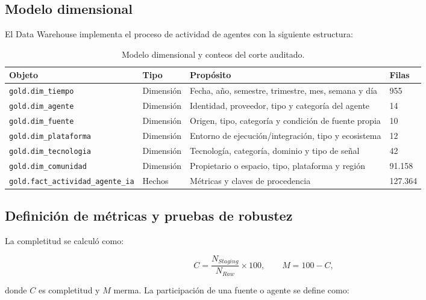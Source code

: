 \documentclass[12pt,a4paper]{article}
\newcommand{\pathcode}[1]{\begingroup\small\ttfamily\nolinkurl{#1}\endgroup}
\begin{document}
\subsection{Modelo dimensional}

El Data Warehouse implementa el proceso de actividad de agentes con la siguiente estructura:

\begin{table}[H]
\centering
\small
{}
\begin{tabularx}{\textwidth}{P{4.2cm} P{2.2cm} Y P{1.5cm}}
\toprule
{}
\textbf{Objeto} & \textbf{Tipo} & \textbf{Propósito} & \textbf{Filas} \\
\midrule
\pathcode{gold.dim_tiempo} & Dimensión & Fecha, año, semestre, trimestre, mes, semana y día & 955 \\
\pathcode{gold.dim_agente} & Dimensión & Identidad, proveedor, tipo y categoría del agente & 14 \\
\pathcode{gold.dim_fuente} & Dimensión & Origen, tipo, categoría y condición de fuente propia & 10 \\
\pathcode{gold.dim_plataforma} & Dimensión & Entorno de ejecución/integración, tipo y ecosistema & 12 \\
\pathcode{gold.dim_tecnologia} & Dimensión & Tecnología, categoría, dominio y tipo de señal & 42 \\
\pathcode{gold.dim_comunidad} & Dimensión & Propietario o espacio, tipo, plataforma y región & 91.158 \\
\pathcode{gold.fact_actividad_agente_ia} & Hechos & Métricas y claves de procedencia & 127.364 \\
\bottomrule
\end{tabularx}
\caption{Modelo dimensional y conteos del corte auditado.}
\label{tab:modelo}
\end{table}

\subsection{Definición de métricas y pruebas de robustez}

La completitud se calculó como:

\begin{equation}
C = \frac{N_{Staging}}{N_{Raw}}\times 100,
\qquad
M = 100-C,
\end{equation}

donde $C$ es completitud y $M$ merma. La participación de una fuente o agente se define como:
\end{document}
